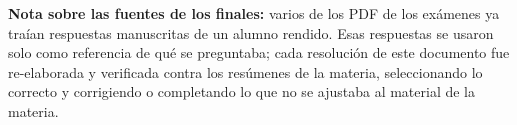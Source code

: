 \documentclass[11pt,a4paper]{article}
\begin{document}
\bigskip
\noindent\textbf{Nota sobre las fuentes de los finales:} varios de los PDF de los exámenes
ya traían respuestas manuscritas de un alumno rendido. Esas respuestas se usaron solo como
referencia de qué se preguntaba; cada resolución de este documento fue re-elaborada y
verificada contra los resúmenes de la materia, seleccionando lo correcto y corrigiendo o
completando lo que no se ajustaba al material de la materia.

\newpage


\clearpage

\clearpage

\clearpage

\clearpage

\clearpage

\clearpage

\clearpage

\clearpage

\end{document}
